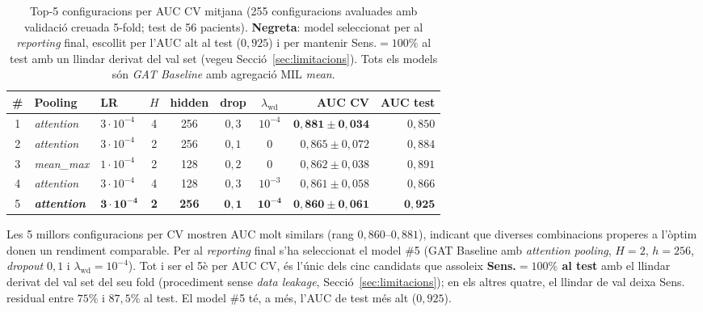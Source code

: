 \documentclass[10pt,a4paper,twocolumn,twoside]{article}
\begin{document}
\begin{table}[t]
\centering
\caption{Top-5 configuracions per AUC CV mitjana (255 configuracions avaluades amb validació
creuada 5-fold; test de 56 pacients). \textbf{Negreta}: model seleccionat per al
\textit{reporting} final, escollit per l'AUC alt al test ($0{,}925$) i per mantenir
Sens.$=100\%$ al test amb un llindar derivat del val set (vegeu Secció~\ref{sec:limitacions}).
Tots els models són \textit{GAT Baseline} amb agregació MIL \textit{mean}.}
\label{tab:grid}
\small
\begin{tabular}{cllccccrr}
\toprule
\textbf{\#} & \textbf{Pooling} & \textbf{LR} & $H$ & \textbf{hidden} & \textbf{drop} & $\lambda_{\text{wd}}$ & \textbf{AUC CV} & \textbf{AUC test} \\
\midrule
1 & \textit{attention} & $3 \!\cdot\! 10^{-4}$ & 4 & 256 & $0{,}3$ & $10^{-4}$ & $\mathbf{0{,}881 \pm 0{,}034}$ & $0{,}850$ \\
2 & \textit{attention} & $3 \!\cdot\! 10^{-4}$ & 2 & 256 & $0{,}1$ & $0$       & $0{,}865 \pm 0{,}072$ & $0{,}884$ \\
3 & \textit{mean\_max} & $1 \!\cdot\! 10^{-4}$ & 2 & 128 & $0{,}2$ & $0$       & $0{,}862 \pm 0{,}038$ & $0{,}891$ \\
4 & \textit{attention} & $3 \!\cdot\! 10^{-4}$ & 4 & 128 & $0{,}3$ & $10^{-3}$ & $0{,}861 \pm 0{,}058$ & $0{,}866$ \\
5 & \textbf{\textit{attention}} & $\mathbf{3 \!\cdot\! 10^{-4}}$ & \textbf{2} & \textbf{256} & $\mathbf{0{,}1}$ & $\mathbf{10^{-4}}$ & $\mathbf{0{,}860 \pm 0{,}061}$ & $\mathbf{0{,}925}$ \\
\bottomrule
\end{tabular}
\end{table}

Les 5 millors configuracions per CV mostren AUC molt similars (rang $0{,}860$–$0{,}881$),
indicant que diverses combinacions properes a l'òptim donen un rendiment comparable.
Per al \textit{reporting} final s'ha seleccionat el model \#5 (GAT Baseline amb
\textit{attention pooling}, $H=2$, $h=256$, \textit{dropout} $0{,}1$ i
$\lambda_{\text{wd}} = 10^{-4}$). Tot i ser el 5è per AUC CV, és l'únic dels cinc
candidats que assoleix \textbf{Sens.$=100\%$ al test} amb el llindar derivat del val
set del seu fold (procediment sense \textit{data leakage}, Secció~\ref{sec:limitacions});
en els altres quatre, el llindar de val deixa Sens. residual entre $75\%$ i $87{,}5\%$
al test. El model \#5 té, a més, l'AUC de test més alt ($0{,}925$).
\end{document}
